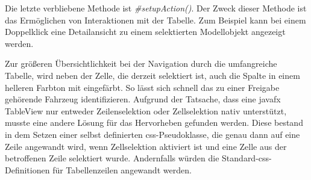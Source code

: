 Die letzte verbliebene Methode ist \textit{\#setupAction()}. Der Zweck dieser Methode ist das Ermöglichen von Interaktionen mit der Tabelle. Zum Beispiel kann bei einem Doppelklick eine Detailansicht zu einem selektierten Modellobjekt angezeigt werden.

Zur größeren Übersichtlichkeit bei der Navigation durch die umfangreiche Tabelle, wird neben der Zelle, die derzeit selektiert ist, auch die Spalte in einem helleren Farbton mit eingefärbt. So lässt sich schnell das zu einer Freigabe gehörende Fahrzeug identifizieren. Aufgrund der Tatsache, dass eine \gls{javafx} TableView nur entweder Zeilenselektion oder Zellselektion nativ unterstützt, musste eine andere Lösung für das Hervorheben gefunden werden. Diese bestand in dem Setzen einer selbst definierten \gls{css}-Pseudoklasse, die genau dann auf eine Zeile angewandt wird, wenn Zellselektion aktiviert ist und eine Zelle aus der betroffenen Zeile selektiert wurde. Andernfalls würden die Standard-\gls{css}-Definitionen für Tabellenzeilen angewandt werden.
